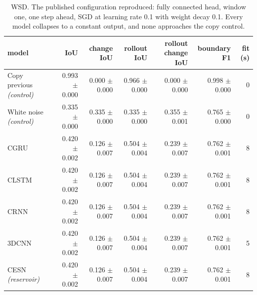 \begin{table}[t]
\centering\small
\begin{tabular}{lrrrrrr}
\toprule
model & IoU & change IoU & rollout IoU & rollout change IoU & boundary F1 & fit (s) \\
\midrule
Copy previous \emph{(control)} & 0.993 {\scriptsize$\pm$ 0.000} & 0.000 {\scriptsize$\pm$ 0.000} & 0.966 {\scriptsize$\pm$ 0.000} & 0.000 {\scriptsize$\pm$ 0.000} & 0.998 {\scriptsize$\pm$ 0.000} & 0 \\
White noise \emph{(control)} & 0.335 {\scriptsize$\pm$ 0.000} & 0.335 {\scriptsize$\pm$ 0.000} & 0.335 {\scriptsize$\pm$ 0.000} & 0.355 {\scriptsize$\pm$ 0.001} & 0.765 {\scriptsize$\pm$ 0.000} & 0 \\
CGRU & 0.420 {\scriptsize$\pm$ 0.002} & 0.126 {\scriptsize$\pm$ 0.007} & 0.504 {\scriptsize$\pm$ 0.004} & 0.239 {\scriptsize$\pm$ 0.007} & 0.762 {\scriptsize$\pm$ 0.001} & 8 \\
CLSTM & 0.420 {\scriptsize$\pm$ 0.002} & 0.126 {\scriptsize$\pm$ 0.007} & 0.504 {\scriptsize$\pm$ 0.004} & 0.239 {\scriptsize$\pm$ 0.007} & 0.762 {\scriptsize$\pm$ 0.001} & 8 \\
CRNN & 0.420 {\scriptsize$\pm$ 0.002} & 0.126 {\scriptsize$\pm$ 0.007} & 0.504 {\scriptsize$\pm$ 0.004} & 0.239 {\scriptsize$\pm$ 0.007} & 0.762 {\scriptsize$\pm$ 0.001} & 8 \\
3DCNN & 0.420 {\scriptsize$\pm$ 0.002} & 0.126 {\scriptsize$\pm$ 0.007} & 0.504 {\scriptsize$\pm$ 0.004} & 0.239 {\scriptsize$\pm$ 0.007} & 0.762 {\scriptsize$\pm$ 0.001} & 5 \\
CESN \emph{(reservoir)} & 0.420 {\scriptsize$\pm$ 0.002} & 0.126 {\scriptsize$\pm$ 0.007} & 0.504 {\scriptsize$\pm$ 0.004} & 0.239 {\scriptsize$\pm$ 0.007} & 0.762 {\scriptsize$\pm$ 0.001} & 8 \\
\bottomrule
\end{tabular}
\caption{WSD. The published configuration reproduced: fully connected head, window one, one step ahead, SGD at learning rate 0.1 with weight decay 0.1. Every model collapses to a constant output, and none approaches the copy control.}
\label{tab:blockA}
\end{table}

